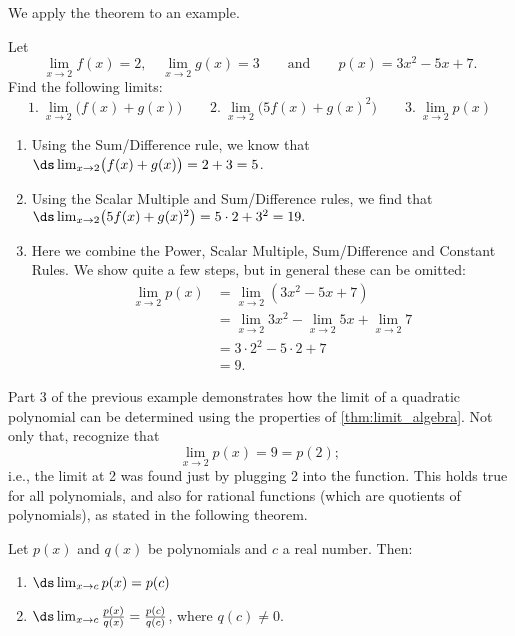 We apply the theorem to an example.

\begin{example}\label{ex_basic_limit_1}
Let\vspace{-.5\baselineskip}
\[
 \lim_{x\to 2} f(x)=2,\quad\lim_{x\to 2} g(x) = 3\qquad\text{and}\qquad
 p(x) = 3x^2-5x+7.
\]
Find the following limits:
\[
1.\ \lim_{x\to 2} \bigl(f(x) + g(x)\bigr)\qquad
2.\ \lim_{x\to 2} \bigl(5f(x) + g(x)^2\bigr)\qquad
3.\ \lim_{x\to 2} p(x)
\]
\solution
\begin{enumerate}
	\item	Using the Sum/Difference rule, we know that $\ds \lim_{x\to 2} \bigl(f(x) + g(x)\bigr) = 2+3 =5$.
	\item	Using the Scalar Multiple and Sum/Difference rules, we find that\\ $\ds \lim_{x\to 2} \bigl(5f(x) + g(x)^2\bigr) = 5\cdot 2 + 3^2 = 19.$
	\item	Here we combine the Power, Scalar Multiple, Sum/Difference and Constant Rules. We show quite a few steps, but in general these can be omitted:\vspace{-.5\baselineskip}
	\begin{align*}
		\lim_{x\to 2} p(x) &= \lim_{x\to 2} (3x^2-5x+7) \\
		&= \lim_{x\to 2} 3x^2-\lim_{x\to 2} 5x+\lim_{x\to 2}7 \\
		&= 3\cdot 2^2 - 5\cdot 2+7 \\
		&= 9.
	\end{align*}
\end{enumerate}
\end{example}

Part 3 of the previous example demonstrates how the limit of a quadratic polynomial can be determined using the properties of \autoref{thm:limit_algebra}. Not only that, recognize that\vspace{-.3\baselineskip}
\[\lim_{x\to 2} p(x) = 9 = p(2);\]
i.e., the limit at 2 was found just by plugging 2 into the function. This holds true for all polynomials, and also for rational functions (which are quotients of polynomials), as stated in the following theorem.

\begin{theorem}\label{thm:poly_rat}
Let $p(x)$ and $q(x)$ be polynomials and $c$ a real number. Then:
\begin{enumerate}
\item	$\ds \lim_{x\to c} p(x) = p(c)$
\item	$\ds \lim_{x\to c} \frac{p(x)}{q(x)} = \frac{p(c)}{q(c)}$, where $q(c) \neq 0$.
\end{enumerate}
\end{theorem}

